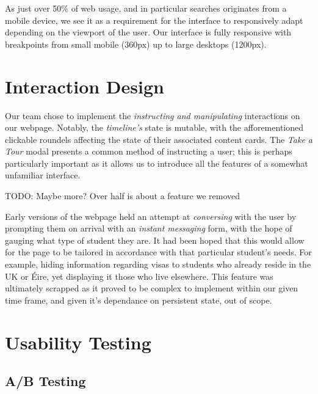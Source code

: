 \documentclass[a4paper, notoc]{tufte-handout}
\begin{document}
As just over 50\% of web usage, and in particular searches originates from a mobile device,
we see it as a requirement for the interface to responsively adapt depending on the 
viewport of the user. Our interface is fully responsive with breakpoints from small
mobile (360px) up to large desktops (1200px).

\section{Interaction Design}\label{label:interaction-design}

Our team chose to implement the \textit{instructing and manipulating} interactions on our 
webpage. Notably, the \textit{timeline's} state is mutable, with the afforementioned
clickable roundels affecting the state of their associated content cards. The \textit{Take a Tour}
modal presents a common method of instructing a user; this is perhaps particularly important
as it allows us to introduce all the features of a somewhat unfamiliar interface.

TODO: Maybe more? Over half is about a feature we removed

Early versions of the webpage held an attempt 
at \textit{conversing} with the user by prompting them on arrival with an \textit{instant 
messaging} form, with the hope of gauging what type of student they are. It had been 
hoped that this would allow for the page to be tailored in accordance with that particular 
student's needs. For example, hiding information regarding visas to students who already 
reside in the UK or Éire, yet displaying it those who live elsewhere. This feature was 
ultimately scrapped as it proved to be complex to implement within our given time frame, and 
given it's dependance on persistent state, out of scope.


\section{Usability Testing}\label{sec:usability-testing}


\subsection{A/B Testing}\label{subsec:a-b-testing}
\end{document}

